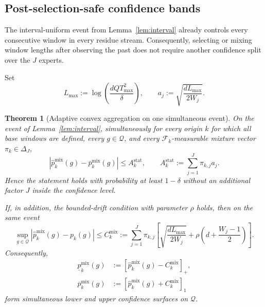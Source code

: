 \documentclass[11pt]{article}
\newtheorem{theorem}{Theorem}
\newcommand{\F}{\mathcal{F}}
\newcommand{\Q}{\mathcal{Q}}
\newcommand{\1}{\mathbf{1}}
\begin{document}
\subsection{Post-selection-safe confidence bands}

The interval-uniform event from Lemma~\ref{lem:interval} already controls every
consecutive window in every residue stream.  Consequently, selecting or mixing
window lengths after observing the past does not require another confidence
split over the $J$ experts.

Set
\begin{equation}
    L_{\max}
    :=
    \log\!\left(
        \frac{dQ T_{\max}^2}{\delta}
    \right),
    \qquad
    a_j
    :=
    \sqrt{\frac{dL_{\max}}{2W_j}}.
    \label{eq:expert-stat-radius}
\end{equation}

\begin{theorem}[Adaptive convex aggregation on one simultaneous event]
\label{thm:adaptive-mixture-band}
On the event of Lemma~\ref{lem:interval}, simultaneously for every origin $k$
for which all base windows are defined, every $g\in\Q$, and every
$\F_k$-measurable mixture vector $\pi_k\in\Delta_J$,
\begin{equation}
    \left|
        \widehat p_k^{\mathrm{mix}}(g)
        -
        \bar p_k^{\mathrm{mix}}(g)
    \right|
    \le
    A_k^{\mathrm{stat}},
    \qquad
    A_k^{\mathrm{stat}}
    :=
    \sum_{j=1}^J\pi_{k,j}a_j.
    \label{eq:adaptive-mixture-stat}
\end{equation}
Hence the statement holds with probability at least $1-\delta$ without an
additional factor $J$ inside the confidence level.

If, in addition, the bounded-drift condition with parameter $\rho$ holds, then
on the same event
\begin{equation}
\boxed{
    \sup_{g\in\Q}
    \left|
        \widehat p_k^{\mathrm{mix}}(g)-p_k(g)
    \right|
    \le
    C_k^{\mathrm{mix}}
    :=
    \sum_{j=1}^J
    \pi_{k,j}
    \left[
        \sqrt{\frac{dL_{\max}}{2W_j}}
        +
        \rho\left(d+\frac{W_j-1}{2}\right)
    \right].
}
\label{eq:adaptive-mixture-current-band}
\end{equation}
Consequently,
\begin{align}
    \underline p_k^{\mathrm{mix}}(g)
    &:=%
    \left[\widehat p_k^{\mathrm{mix}}(g)-C_k^{\mathrm{mix}}\right]_+,
    \\
    \overline p_k^{\mathrm{mix}}(g)
    &:=%
    \left[\widehat p_k^{\mathrm{mix}}(g)+C_k^{\mathrm{mix}}\right]_1
\end{align}
form simultaneous lower and upper confidence surfaces on $\Q$.
\end{theorem}
\end{document}
